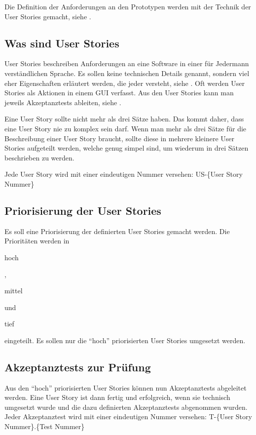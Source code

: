   Die Definition der Anforderungen an den Prototypen werden mit der Technik der
  User Stories gemacht, siehe \cite{UserStories}.
  
  \subsection{Was sind User Stories}
  
  User Stories beschreiben Anforderungen an eine Software in einer für Jedermann
  verständlichen Sprache. Es sollen keine technischen Details genannt, sondern
  viel eher Eigenschaften erläutert werden, die jeder versteht, siehe
  \cite{UserStories}. Oft werden User Stories als Aktionen in einem \ac{GUI}
  verfasst. Aus den User Stories kann man jeweils Akzeptanztests ableiten,
  siehe \cite{AcceptanceTests}.
  
  Eine User Story sollte nicht mehr als drei Sätze haben. Das kommt daher, dass
  eine User Story nie zu komplex sein darf. Wenn man mehr als drei Sätze für die
  Beschreibung einer User Story braucht, sollte diese in mehrere kleinere User
  Stories aufgeteilt werden, welche genug simpel sind, um wiederum in drei
  Sätzen beschrieben zu werden.
  
  Jede User Story wird mit einer eindeutigen Nummer versehen: US-\{User Story
  Nummer\}
  
  \subsection{Priorisierung der User Stories}
  
  Es soll eine Priorisierung der definierten User Stories gemacht werden. Die
  Prioritäten werden in \begin{itshape}hoch\end{itshape},
  \begin{itshape}mittel\end{itshape} und
  \begin{itshape}tief\end{itshape} eingeteilt. Es sollen nur die ``hoch''
  priorisierten User Stories umgesetzt werden.
  
  \subsection{Akzeptanztests zur Prüfung}
  
  Aus den ``hoch'' priorisierten User Stories können nun Akzeptanztests
  abgeleitet werden. Eine User Story ist dann fertig und erfolgreich,
  wenn sie technisch umgesetzt wurde und die dazu definierten Akzeptanztests
  abgenommen wurden. Jeder Akzeptanztest wird mit einer eindeutigen Nummer
  versehen: T-\{User Story Nummer\}.\{Test Nummer\}
  
